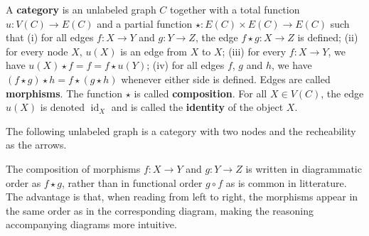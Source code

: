 \begin{definition}
    \label{def:cat}
    A \textbf{category} is an unlabeled graph \( C \) together with a total function \( u : V(C) \to E(C) \) and a partial function \( \star: E(C) \times E(C) \to E(C) \) such that 
        (i) for all edges \( f:X \to Y \) and \( g:Y \to Z \), the edge \( f \star g :X \to Z \) is defined; 
        (ii) for every node \( X \), \( u(X) \) is an edge from \( X \) to \( X \);
        (iii) for every \( f:X \to Y \), we have \(u(X) \star f = f = f \star u(Y)\);
        (iv) for all edges \( f \), \( g \) and \(h\), we have \( (f \star g) \star h = f \star (g \star h) \) whenever either side is defined.
    Edges are called \textbf{morphisms}. The function $\star$ is called \textbf{composition}. For all \( X \in V(C) \), the edge \( u(X) \) is denoted \( \operatorname{id}_X \) and is called the \textbf{identity} of the object \( X \).
\end{definition} 

\begin{example}
    The following unlabeled graph is a category with two nodes and the recheability as the arrows.
           \begin{center}
    \end{center}
\end{example}

\begin{notation}
    The composition of morphisms \( f : X \to Y \) and \( g : Y \to Z \) is written in diagrammatic order as \( f \star g \), rather than in functional order \( g \circ f \) as is common in litterature. The advantage is that, when reading from left to right, the morphisms appear in the same order as in the corresponding diagram, making the reasoning accompanying diagrams more intuitive. 
\end{notation}  


